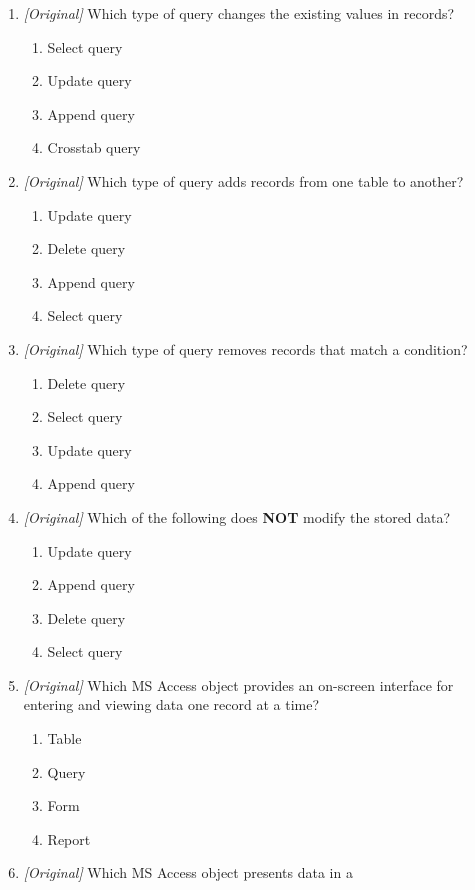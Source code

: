 \documentclass[11pt]{article}
\begin{document}
\begin{enumerate}[label=\textbf{Q\arabic*.}, leftmargin=*]
\item \textit{[Original]} Which type of query changes the existing values in
  records?
  \begin{enumerate}[label=\Alph*.]
    \item Select query
    \item Update query
    \item Append query
    \item Crosstab query
  \end{enumerate}
\item \textit{[Original]} Which type of query adds records from one table to
  another?
  \begin{enumerate}[label=\Alph*.]
    \item Update query
    \item Delete query
    \item Append query
    \item Select query
  \end{enumerate}
\item \textit{[Original]} Which type of query removes records that match a
  condition?
  \begin{enumerate}[label=\Alph*.]
    \item Delete query
    \item Select query
    \item Update query
    \item Append query
  \end{enumerate}
\item \textit{[Original]} Which of the following does \textbf{NOT} modify the
  stored data?
  \begin{enumerate}[label=\Alph*.]
    \item Update query
    \item Append query
    \item Delete query
    \item Select query
  \end{enumerate}
\item \textit{[Original]} Which MS Access object provides an on-screen
  interface for entering and viewing data one record at a time?
  \begin{enumerate}[label=\Alph*.]
    \item Table
    \item Query
    \item Form
    \item Report
  \end{enumerate}
\item \textit{[Original]} Which MS Access object presents data in a

\end{enumerate}
\end{document}
